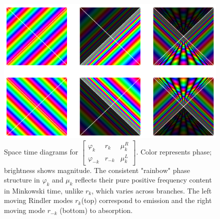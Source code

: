 \documentclass[12pt,a4paper]{article}
\begin{document}
\begin{figure}[h]
\centering
\includegraphics[scale=0.5]{unruh_mode_rainbow.png}
\captionsetup{width=0.7\textwidth}
\caption{Space time diagrams for $\left[\begin{array}{ccc} \varphi_k & r_k & \mu^R_k \\ \varphi_{-k} & r_{-k} & \mu^L_k \end{array} \right]$. Color represents phase; brightness shows magnitude. The consistent "rainbow" phase structure in $\varphi_k$ and $\mu_k$ reflects their pure positive frequency content in Minkowski time, unlike $r_k$, which varies across branches. The left moving Rindler modes $r_k$(top) correspond to emission and the right moving mode $r_{-k}$ (bottom) to absorption.}
\label{unruh_rainbow}
\end{figure}
\end{document}
